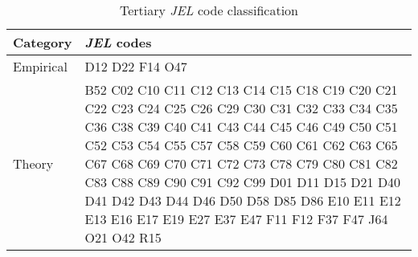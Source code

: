 \begin{table}
    \footnotesize
    \centering
    \begin{threeparttable}
        \caption{Tertiary \textit{JEL} code classification}
        \label{jel_list}
        \begin{tabular}{lp{13cm}}
            \toprule
            Category&\textit{JEL} codes\\
            \midrule
            Empirical&D12 D22 F14 O47\\
            Theory&B52 C02 C10 C11 C12 C13 C14 C15 C18 C19 C20 C21 C22 C23 C24 C25 C26 C29 C30 C31 C32 C33 C34 C35 C36 C38 C39 C40 C41 C43 C44 C45 C46 C49 C50 C51 C52 C53 C54 C55 C57 C58 C59 C60 C61 C62 C63 C65 C67 C68 C69 C70 C71 C72 C73 C78 C79 C80 C81 C82 C83 C88 C89 C90 C91 C92 C99 D01 D11 D15 D21 D40 D41 D42 D43 D44 D46 D50 D58 D85 D86 E10 E11 E12 E13 E16 E17 E19 E27 E37 E47 F11 F12 F37 F47 J64 O21 O42 R15\\

\end{tabular}
\end{threeparttable}
\end{table}
